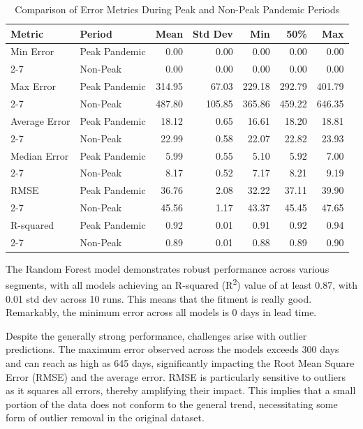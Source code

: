\documentclass[12pt]{report}
\begin{document}
\begin{table}[h!]
\centering
\begin{tabular}{|l|l|r|r|r|r|r|}
\hline
\textbf{Metric} & \textbf{Period} & \textbf{Mean} & \textbf{Std Dev} & \textbf{Min} & \textbf{50\%} & \textbf{Max} \\ \hline
Min Error & Peak Pandemic & 0.00 & 0.00 & 0.00 & 0.00 & 0.00 \\ \cline{2-7}
 & Non-Peak & 0.00 & 0.00 & 0.00 & 0.00 & 0.00 \\ \hline
Max Error & Peak Pandemic & 314.95 & 67.03 & 229.18 & 292.79 & 401.79 \\ \cline{2-7}
 & Non-Peak & 487.80 & 105.85 & 365.86 & 459.22 & 646.35 \\ \hline
Average Error & Peak Pandemic & 18.12 & 0.65 & 16.61 & 18.20 & 18.81 \\ \cline{2-7}
 & Non-Peak & 22.99 & 0.58 & 22.07 & 22.82 & 23.93 \\ \hline
Median Error & Peak Pandemic & 5.99 & 0.55 & 5.10 & 5.92 & 7.00 \\ \cline{2-7}
 & Non-Peak & 8.17 & 0.52 & 7.17 & 8.21 & 9.19 \\ \hline
RMSE & Peak Pandemic & 36.76 & 2.08 & 32.22 & 37.11 & 39.90 \\ \cline{2-7}
 & Non-Peak & 45.56 & 1.17 & 43.37 & 45.45 & 47.65 \\ \hline
R-squared & Peak Pandemic & 0.92 & 0.01 & 0.91 & 0.92 & 0.94 \\ \cline{2-7}
 & Non-Peak & 0.89 & 0.01 & 0.88 & 0.89 & 0.90 \\ \hline
\end{tabular}
\caption{Comparison of Error Metrics During Peak and Non-Peak Pandemic Periods}
\label{table:peak_vs_nonpeak}
\end{table}

The Random Forest model demonstrates robust performance across various segments, with all models achieving an R-squared (R\textsuperscript{2}) value of at least 0.87, with 0.01 std dev across 10 runs. This means that the fitment is really good. Remarkably, the minimum error across all models is 0 days in lead time.

Despite the generally strong performance, challenges arise with outlier predictions. The maximum error observed across the models exceeds 300 days and can reach as high as 645 days, significantly impacting the Root Mean Square Error (RMSE) and the average error. RMSE is particularly sensitive to outliers as it squares all errors, thereby amplifying their impact. This implies that a small portion of the data does not conform to the general trend, necessitating some form of outlier removal in the original dataset.
\end{document}
